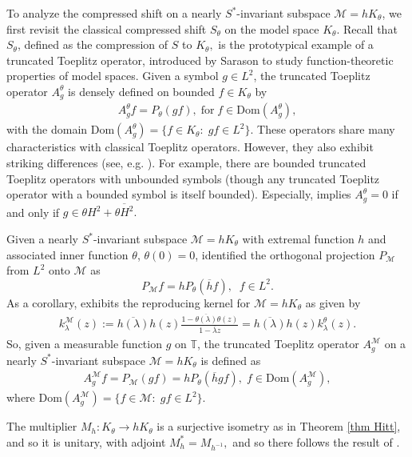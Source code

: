 \documentclass[12pt,reqno]{amsart}
\theoremstyle{definition}
\theoremstyle{remark}
\numberwithin{equation}{section}
\newcommand{\ol}{\overline}
\newcommand{\ma}{\mathcal}
\begin{document}
To analyze the compressed shift on a nearly $S^*$-invariant subspace $\ma{M} = h K_\theta$, we first revisit the classical compressed shift $S_\theta$ on the model space $K_\theta$. Recall that $S_\theta$, defined as the compression of $S$ to $K_\theta,$ is the prototypical example of a truncated Toeplitz operator, introduced by Sarason to study function-theoretic properties of model spaces.  Given a symbol $g\in L^2$, the truncated Toeplitz operator $A_g^\theta$ is densely defined on    bounded $f\in K_\theta$ by
\begin{align*}A_g^\theta f=P_{\theta}(g  f),\;\mbox{for}\;f\in \mbox{Dom}(A_g^\theta),\end{align*} with the domain $\mbox{Dom}(A_g^\theta)=\{f\in K_\theta:\; g f\in L^2\}.$  These operators share many characteristics with classical Toeplitz operators. However, they also exhibit striking differences
(see, e.g. \cite{Sarason1}).  For example, there are bounded truncated Toeplitz operators with unbounded symbols (though any truncated Toeplitz operator with a bounded symbol is itself bounded). Especially, \cite[Theorem 3.1]{Sarason1} implies $A_g^{\theta}=0$ if and only if $g\in \theta H^2+\ol{\theta H^2}.$

Given a nearly $S^*$-invariant subspace $\ma{M}=hK_\theta$  with extremal function $h$ and associated inner function $\theta$, $\theta(0)=0$, \cite[Lemma 2.5]{HR} identified the orthogonal projection $P_\ma{M}$ from $L^2$ onto $\ma{M}$ as $$P_\ma{M} f=hP_\theta(\ol{h} f), \;\;f\in L^2.$$ As a corollary, \cite[Corollary 2.6]{HR} exhibits the reproducing kernel for  $\ma{M}=hK_\theta$
as given by
 \begin{align*}k_{\lambda}^\ma{M}(z):=\ol{h(\lambda)}h(z) \frac{1-\ol{\theta(\lambda)}\theta(z)}{1-\ol{\lambda} z}=\ol{h(\lambda)}h(z)k_\lambda^{\theta}(z).\end{align*} So, given a measurable function $g$ on $\mathbb{T}$, the truncated Toeplitz operator $A_g^\ma{M}$ on a nearly $S^*$-invariant subspace $\ma{M} = hK_\theta$ is  defined as \begin{align*}A_g^\ma{M} f=P_\ma{M}(g  f)=hP_\theta(\ol{h}gf),\; f\in \mbox{Dom}(A_g^\ma{M}),\end{align*} where Dom$(A_g^\ma{M})=\{f \in \ma{M}:\; g f \in L^2\}.$

The multiplier $M_h: K_\theta \rightarrow  hK_\theta$ is a surjective isometry as in Theorem \ref{thm Hitt}, and so it is unitary,  with adjoint $M_h^*= M_{h^{-1}},$ and so there follows the
  result of \cite[Theorem 3.1]{HR}.
\end{document}
